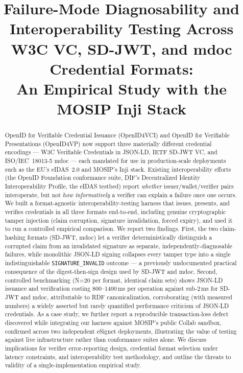 \documentclass[conference]{IEEEtran}
\begin{document}
\title{Failure-Mode Diagnosability and Interoperability Testing Across\\
W3C VC, SD-JWT, and mdoc Credential Formats:\\
An Empirical Study with the MOSIP Inji Stack}

\author{
}

\maketitle

\begin{abstract}
OpenID for Verifiable Credential Issuance (OpenID4VCI) and OpenID for Verifiable Presentations (OpenID4VP) now support three materially different credential encodings --- W3C Verifiable Credentials in JSON-LD, IETF SD-JWT VC, and ISO/IEC~18013-5 mdoc --- each mandated for use in production-scale deployments such as the EU's eIDAS~2.0 and MOSIP's Inji stack. Existing interoperability efforts (the OpenID Foundation conformance suite, DIF's Decentralized Identity Interoperability Profile, the eIDAS testbed) report \emph{whether} issuer/wallet/verifier pairs interoperate, but not \emph{how informatively} a verifier can explain a failure once one occurs. We built a format-agnostic interoperability-testing harness that issues, presents, and verifies credentials in all three formats end-to-end, including genuine cryptographic tamper injection (claim corruption, signature invalidation, forced expiry), and used it to run a controlled empirical comparison. We report two findings. First, the two claim-hashing formats (SD-JWT, mdoc) let a verifier deterministically distinguish a corrupted claim from an invalidated signature as separate, independently-diagnosable failures, while monolithic JSON-LD signing collapses every tamper type into a single indistinguishable \texttt{SIGNATURE\_INVALID} outcome --- a previously undocumented practical consequence of the digest-then-sign design used by SD-JWT and mdoc. Second, controlled benchmarking (N=20 per format, identical claim sets) shows JSON-LD issuance and verification costing 800--1400\,ms per operation against sub-2\,ms for SD-JWT and mdoc, attributable to RDF canonicalization, corroborating (with measured numbers) a widely asserted but rarely quantified performance criticism of JSON-LD credentials. As a case study, we further report a reproducible transaction-loss defect discovered while integrating our harness against MOSIP's public Collab sandbox, confirmed across two independent eSignet deployments, illustrating the value of testing against live infrastructure rather than conformance suites alone. We discuss implications for verifier error-reporting design, credential format selection under latency constraints, and interoperability test methodology, and outline the threats to validity of a single-implementation empirical study.
\end{abstract}
\end{document}
